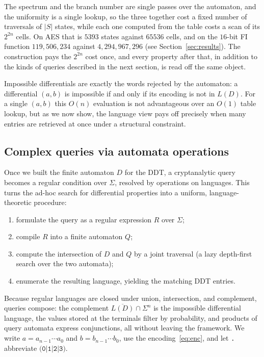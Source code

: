 \documentclass[runningheads]{llncs}
\newcommand{\Sig}{\Sigma}
\begin{document}
The spectrum and the branch number are single passes over the automaton, and the uniformity is a single lookup, so the three together cost a fixed number of traversals of $|S|$ states, while each one computed from the table costs a scan of its $2^{2n}$ cells. On AES that is $5393$ states against $65536$ cells, and on the $16$-bit FI function $119{,}506{,}234$ against $4{,}294{,}967{,}296$ (see Section~\ref{sec:results}). The construction pays the $2^{2n}$ cost once, and every property after that, in addition to the kinds of queries described in the next section, is read off the same object.

Impossible differentials are exactly the words rejected by the automaton: a differential $(a, b)$ is impossible if and only if its encoding is not in $L(D)$. For a single $(a, b)$ this $O(n)$ evaluation is not advantageous over an $O(1)$ table lookup, but as we now show, the language view pays off precisely when many entries are retrieved at once under a structural constraint.

\subsection{Complex queries via automata operations}
\label{sec:queries}

Once we built the finite automaton $D$ for the DDT, a cryptanalytic query becomes a regular
condition over $\Sig$, resolved by operations on languages. This turns the
ad-hoc search for differential properties into a uniform, language-theoretic
procedure:
\begin{enumerate}
  \item formulate the query as a regular expression $R$ over $\Sig$;
  \item compile $R$ into a finite automaton $Q$;
  \item compute the intersection of $D$ and $Q$ by a joint traversal (a lazy
        depth-first search over the two automata);
  \item enumerate the resulting language, yielding the matching DDT entries.
\end{enumerate}
Because regular languages are closed under union, intersection, and complement,
queries compose: the complement $\overline{L(D)}\cap\Sig^{n}$ is the impossible differential
language, the values stored at the terminals filter by probability, and
products of query automata express conjunctions, all without leaving the
framework. We write $a=a_{n-1}\cdots a_0$ and $b=b_{n-1}\cdots b_0$, use the
encoding~\eqref{eq:enc}, and let \texttt{.} abbreviate $\texttt{(0|1|2|3)}$.
\end{document}
